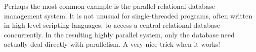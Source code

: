 Perhaps the most common example is the parallel relational database
management system.
It is not unusual for single-threaded programs, often written in
high-level scripting languages, to access a central relational
database concurrently.
In the resulting highly parallel system, only the database need actually
deal directly with parallelism.
A very nice trick when it works!

\fi
